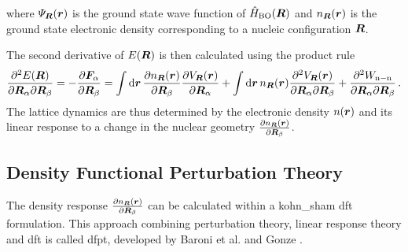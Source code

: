 \documentclass[main.tex]{subfiles}
\begin{document}
where \(\Psi_{\vb*{R}} (\vb*{r})\) is the ground state wave function of \(\hat{H}_{\mathrm{BO}} (\vb*{R})\) and \(n_{\vb*{R}} (\vb*{r})\) is the ground state electronic density corresponding to a nucleic configuration \(\vb*{R}\).

The second derivative of \(E(\vb*{R})\) is then calculated using the product rule
\begin{equation}\label{eq:dfpt_second_energy_derivative}
    \pdv{E(\vb*{R})}{\vb*{R}_{\alpha}}{\vb*{R}_{\beta}} = - \pdv{\vb*{F}_{\alpha}}{\vb*{R}_{\beta}} = \int \dd{\vb*{r}} \pdv{n_{\vb*{R}} (\vb*{r})}{\vb*{R}_{\beta}}  \pdv{V_{\vb*{R}} (\vb*{r})}{\vb*{R}_{\alpha}}
    + \int \dd{\vb*{r}} n_{\vb*{R}} (\vb*{r}) \pdv{V_{\vb*{R}} (\vb*{r})}{\vb*{R}_{\alpha}}{\vb*{R}_{\beta}}
    + \pdv{W_{\mathrm{n-n}}}{\vb*{R}_{\alpha}}{\vb*{R}_{\beta}} \,.
\end{equation}
The lattice dynamics are thus determined by the electronic density \(n(\vb*{r})\) and its linear response to a change in the nuclear geometry \(\pdv{n_{\vb*{R}} (\vb*{r})}{\vb*{R}_{\beta}}\).

\subsection{Density Functional Perturbation Theory}

The density response \(\pdv{n_{\vb*{R}} (\vb*{r})}{\vb*{R}_{\beta}}\) can be calculated within a \acrshort{kohn_sham} \acrshort{dft} formulation.
This approach combining perturbation theory, linear response theory and \acrshort{dft} is called \acrfull{dfpt}, developed by Baroni et al. \cite{baroni_greens-function_1987} and Gonze \cite{gonze_adiabatic_1995}.
\end{document}
